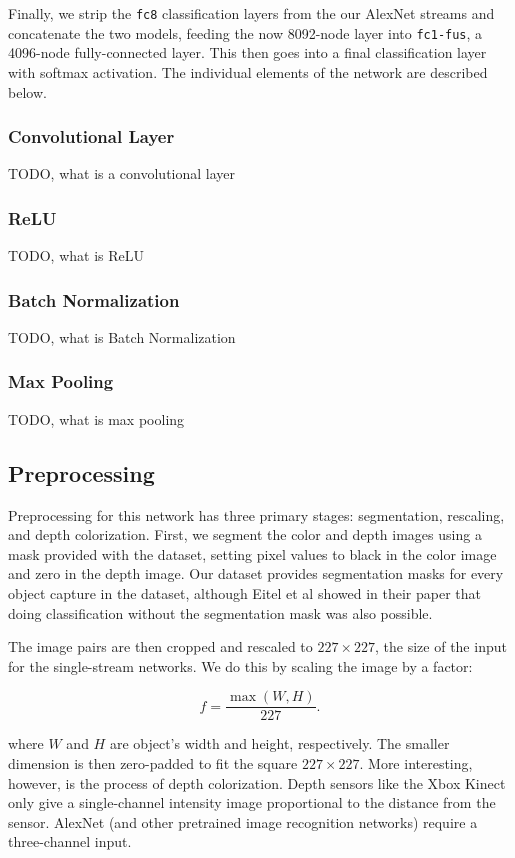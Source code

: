 Finally, we strip the \texttt{fc8} classification layers from the our AlexNet
streams and concatenate the two models, feeding the now 8092-node layer into
\texttt{fc1-fus}, a 4096-node fully-connected layer. This then goes into a final classification layer with softmax activation. The individual elements of the network are described below.

\subsubsection{Convolutional Layer}
TODO, what is a convolutional layer

\subsubsection{ReLU}
TODO, what is ReLU

\subsubsection{Batch Normalization}
TODO, what is Batch Normalization

\subsubsection{Max Pooling}
TODO, what is max pooling




\subsection{Preprocessing}

Preprocessing for this network has three primary stages: segmentation, rescaling, and depth colorization. First, we segment the color and depth images using a mask provided with the dataset, setting pixel values to black in the color image and zero in the depth image. Our dataset provides segmentation masks for every object capture in the dataset, although Eitel et al \cite{Eitel2015} showed in their paper that doing classification without the segmentation mask was also possible.

The image pairs are then cropped and rescaled to $227 \times 227$, the size of the input for the single-stream networks. We do this by scaling the image by a factor:

\[ f = \frac{\max(W, H)}{227}. \]

where $W$ and $H$ are object's width and height, respectively. The smaller dimension is then zero-padded to fit the square $227 \times 227$. More interesting, however, is the process of depth colorization. Depth sensors like the Xbox Kinect only give a single-channel intensity image proportional to the distance from the sensor. AlexNet (and other pretrained image recognition networks) require a three-channel input.


